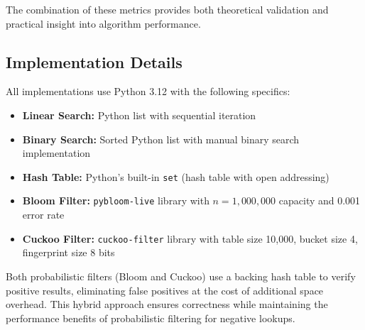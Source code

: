 The combination of these metrics provides both theoretical validation and practical insight into algorithm performance.

\subsection{Implementation Details}

All implementations use Python 3.12 with the following specifics:

\begin{itemize}
    \item \textbf{Linear Search:} Python list with sequential iteration
    \item \textbf{Binary Search:} Sorted Python list with manual binary search implementation
    \item \textbf{Hash Table:} Python's built-in \texttt{set} (hash table with open addressing)
    \item \textbf{Bloom Filter:} \texttt{pybloom-live} library with $n=1,000,000$ capacity and 0.001 error rate
    \item \textbf{Cuckoo Filter:} \texttt{cuckoo-filter} library with table size 10,000, bucket size 4, fingerprint size 8 bits
\end{itemize}

Both probabilistic filters (Bloom and Cuckoo) use a backing hash table to verify positive results, eliminating false positives at the cost of additional space overhead. This hybrid approach ensures correctness while maintaining the performance benefits of probabilistic filtering for negative lookups.
